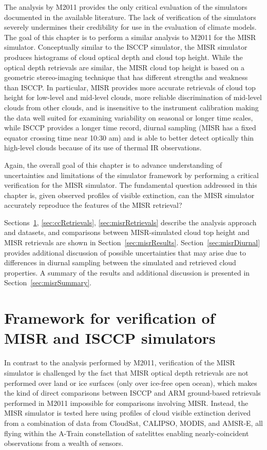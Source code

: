 The analysis by M2011 provides the only critical evaluation of the
simulators documented in the available literature. The lack of
verification of the simulators severely undermines their credibility for
use in the evaluation of climate models. The goal of this chapter is to
perform a similar analysis to M2011 for the MISR simulator. Conceptually
similar to the ISCCP simulator, the MISR simulator produces histograms
of cloud optical depth and cloud top height. While the optical depth
retrievals are similar, the MISR cloud top height is based on a
geometric stereo-imaging technique that has different strengths and
weakness than ISCCP. In particular, MISR provides more accurate
retrievals of cloud top height for low-level and mid-level clouds, more
reliable discrimination of mid-level clouds from other clouds, and is
insensitive to the instrument calibration making the data well suited
for examining variability on seasonal or longer time scales, while ISCCP
provides a longer time record, diurnal sampling (MISR has a fixed
equator crossing time near 10:30 am) and is able to better detect
optically thin high-level clouds because of its use of thermal IR
observations.

Again, the overall goal of this chapter is to advance understanding of
uncertainties and limitations of the simulator framework by performing a
critical verification for the MISR simulator. The fundamental question
addressed in this chapter is, given observed profiles of visible
extinction, can the MISR simulator accurately reproduce the features of
the MISR retrieval?

Sections~\ref{sec:framework}, \ref{sec:ccRetrievals}, \ref{sec:misrRetrievals}
describe the analysis approach and datasets, and comparisons between
MISR-simulated cloud top height and MISR retrievals are shown in
Section~\ref{sec:misrResults}. Section~\ref{sec:misrDiurnal} provides
additional discussion of possible uncertainties that may arise due to
differences in diurnal sampling between the simulated and retrieved
cloud properties. A summary of the results and additional discussion is
presented in Section~\ref{sec:misrSummary}.

\section{Framework for verification of MISR and ISCCP
simulators}\label{sec:framework}

In contrast to the analysis performed by M2011, verification of the MISR
simulator is challenged by the fact that MISR optical depth retrievals
are not performed over land or ice surfaces (only over ice-free open
ocean), which makes the kind of direct comparisons between ISCCP and ARM
ground-based retrievals performed in M2011 impossible for comparisons
involving MISR. Instead, the MISR simulator is tested here using
profiles of cloud visible extinction derived from a combination of data
from CloudSat, CALIPSO, MODIS, and AMSR-E, all flying within the A-Train
constellation of satelittes enabling nearly-coincident observations from
a wealth of sensors.

